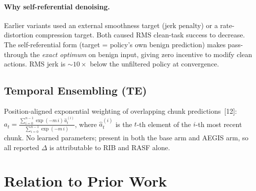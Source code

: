 \documentclass[11pt,a4paper]{article}
\begin{document}
\paragraph{Why self-referential denoising.}
Earlier variants used an external smoothness target (jerk penalty) or a rate-distortion
compression target. Both caused RMS clean-task success to decrease. The self-referential
form (target = policy's own benign prediction) makes pass-through the \emph{exact optimum}
on benign input, giving zero incentive to modify clean actions. RMS jerk is $\sim\!10\times$
below the unfiltered policy at convergence.

\subsection{Temporal Ensembling (TE)}

Position-aligned exponential weighting of overlapping chunk predictions~[12]:
$a_t = \frac{\sum_{i=0}^{n-1} \exp(-m\,i)\,\hat{a}^{(i)}_t}{\sum_{i=0}^{n-1} \exp(-m\,i)}$,
where $\hat{a}^{(i)}_t$ is the $t$-th element of the $i$-th most recent chunk. No learned
parameters; present in both the base arm and AEGIS arm, so all reported $\Delta$ is attributable
to RIB and RASF alone.

\section{Relation to Prior Work}
\label{sec:related}
\end{document}
